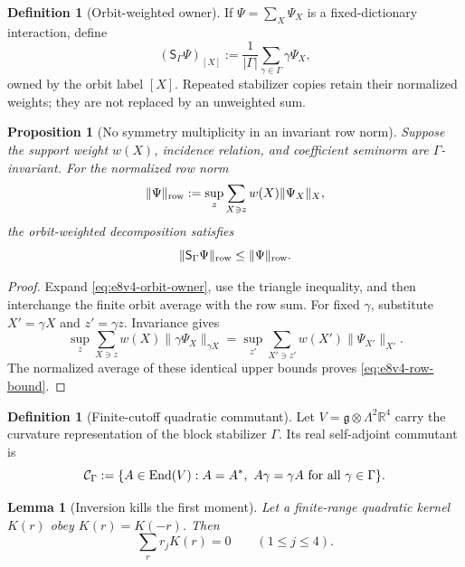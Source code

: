 \documentclass[11pt,oneside]{book}
\newtheorem{lemma}[theorem]{Lemma}
\newtheorem{proposition}[theorem]{Proposition}
\theoremstyle{definition}
\newtheorem{definition}[theorem]{Definition}
\theoremstyle{remark}
\begin{document}
\begin{definition}[Orbit-weighted owner]
\label{def:e8v4-owner}
If \(\Psi=\sum_X\Psi_X\) is a fixed-dictionary interaction, define
\[
 ({\mathsf S}_{\Gamma}\Psi)_{[X]}
 :=
 \frac1{|\Gamma|}\sum_{\gamma\in\Gamma}
       \gamma\Psi_X,                                 \label{eq:e8v4-orbit-owner}
\]
owned by the orbit label \([X]\).  Repeated stabilizer copies retain
their normalized weights; they are not replaced by an unweighted
sum.
\end{definition}

\begin{proposition}[No symmetry multiplicity in an invariant row norm]
\label{prop:e8v4-orbit-norm}
Suppose the support weight \(w(X)\), incidence relation, and
coefficient seminorm are \(\Gamma\)-invariant.  For the normalized
row norm
\[
 \|\Psi\|_{\rm row}
 :=\sup_z\sum_{X\ni z}w(X)\|\Psi_X\|_X,              \label{eq:e8v4-row}
\]
the orbit-weighted decomposition satisfies
\[
 \|{\mathsf S}_{\Gamma}\Psi\|_{\rm row}
 \leq\|\Psi\|_{\rm row}.                             \label{eq:e8v4-row-bound}
\]
\end{proposition}

\begin{proof}
Expand \eqref{eq:e8v4-orbit-owner}, use the triangle inequality, and
then interchange the finite orbit average with the row sum.  For
fixed \(\gamma\), substitute \(X'=\gamma X\) and \(z'=\gamma z\).
Invariance gives
\[
 \sup_z\sum_{X\ni z}w(X)\|\gamma\Psi_X\|_{\gamma X}
 =\sup_{z'}\sum_{X'\ni z'}w(X')\|\Psi_{X'}\|_{X'}.
\]
The normalized average of these identical upper bounds proves
\eqref{eq:e8v4-row-bound}.
\end{proof}

\begin{definition}[Finite-cutoff quadratic commutant]
\label{def:e8v4-commutant}
Let \(V=\mathfrak g\otimes\Lambda^2\mathbb R^4\) carry the curvature
representation of the block stabilizer \(\Gamma\).  Its real
self-adjoint commutant is
\[
 {\mathcal C}_\Gamma
 :=\{A\in\operatorname{End}(V):A=A^*,\
       A\gamma=\gamma A\ \hbox{for all }\gamma\in\Gamma\}. \label{eq:e8v4-commutant}
\]
\end{definition}

\begin{lemma}[Inversion kills the first moment]
\label{lem:e8v4-first-moment}
Let a finite-range quadratic kernel \(K(r)\) obey
\(K(r)=K(-r)\).  Then
\[
 \sum_r r_jK(r)=0\qquad(1\leq j\leq4).               \label{eq:e8v4-first-moment}
\]
\end{lemma}
\end{document}
